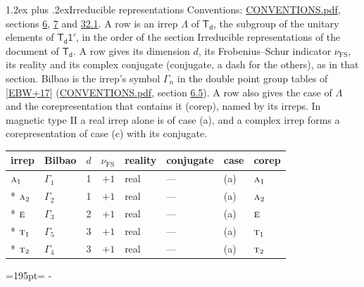 \documentclass[10pt,a4paper]{article}
\makeatletter
\renewcommand\section{\@startsection{section}{1}{\z@}{-3ex plus -1ex minus -.2ex}%
  {1.2ex plus .2ex}{\normalfont\large\sffamily\bfseries\color{parttitle}}}
\newcommand{\needspace}[1]{\par\penalty-100\begingroup\dimen0=#1\relax\dimen2=\pagegoal
  \advance\dimen2-\pagetotal\ifdim\dimen0>\dimen2\relax\ifdim\dimen2>0pt\vfil\break\fi\fi
  \endgroup}
\numberwithin{equation}{section}
\newcommand{\grp}[1]{\mathsf{#1}}
\newcommand{\irr}[1]{\text{\normalfont\scshape #1}}
\newcommand{\fsind}{\nu_{\mathrm{FS}}}
\makeatother
\begin{document}
\section{Irreducible representations}\label{s:irreps}
Conventions: \href{../../CONVENTIONS.pdf}{CONVENTIONS.pdf}, sections \href{../../../rotation/CONVENTIONS.pdf\#conv.6}{6}, \href{../../../rotation/CONVENTIONS.pdf\#conv.7}{7} and \href{../../CONVENTIONS.pdf\#conv.32.1}{32.1}.
\leavevmode\label{n:irrep.Delta}A row is an irrep $\Lambda$ of $\grp{T_{d}}$, the subgroup of the unitary elements of $\grp{T_{d}1'}$, in the order of the section Irreducible representations of the document of \href{../../../rotation/data/pdf/Td.pdf}{$\grp{T_{d}}$}. \label{n:index.dimension}\label{n:index.frobenius}\label{n:head.irrep}\label{n:head.reality}\label{n:head.conjugate}A row gives its dimension $d$, its Frobenius--Schur indicator $\fsind$, its reality and its complex conjugate (conjugate, a dash for the others), as in that section. \label{n:head.bilbao}\label{n:irrep.alias.gamma}Bilbao is the irrep's symbol $\Gamma_n$ in the double point group tables of [\href{../../../REFERENCES.pdf\#ref.EBW+17}{EBW+17}] (\href{../../CONVENTIONS.pdf}{CONVENTIONS.pdf}, section \href{../../../rotation/CONVENTIONS.pdf\#conv.6.5}{6.5}). \label{n:head.case.corep}\label{n:head.corep}A row also gives the case of $\Lambda$ and the corepresentation that contains it (corep), named by its irreps. In magnetic type II a real irrep alone is of case (a), and a complex irrep forms a corepresentation of case (c) with its conjugate.
\setlength{\emergencystretch}{2em}\par\setlength{\emergencystretch}{0pt}
{\small\renewcommand{\arraystretch}{1.25}\setlength{\tabcolsep}{4pt}\begin{longtable}{@{}llrrllll@{}}\toprule
irrep & Bilbao & $d$ & $\fsind$ & reality & conjugate & case & corep\\\midrule\endhead
\bottomrule\endfoot\endlastfoot
$\irr{a}_{1}$ & $\Gamma_{1}$ & 1 & $+1$ & real & --- & (a) & $\irr{a}_{1}$\\*
$\irr{a}_{2}$ & $\Gamma_{2}$ & 1 & $+1$ & real & --- & (a) & $\irr{a}_{2}$\\*
$\irr{e}$ & $\Gamma_{3}$ & 2 & $+1$ & real & --- & (a) & $\irr{e}$\\*
$\irr{t}_{1}$ & $\Gamma_{5}$ & 3 & $+1$ & real & --- & (a) & $\irr{t}_{1}$\\*
$\irr{t}_{2}$ & $\Gamma_{4}$ & 3 & $+1$ & real & --- & (a) & $\irr{t}_{2}$\\
\bottomrule\end{longtable}}
\needspace{195pt}
\end{document}
